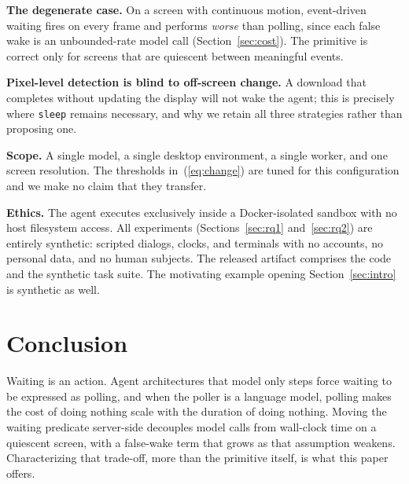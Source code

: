 \documentclass[conference]{IEEEtran}
\begin{document}
\textbf{The degenerate case.} On a screen with continuous motion, event-driven
waiting fires on every frame and performs \emph{worse} than polling, since each
false wake is an unbounded-rate model call (Section~\ref{sec:cost}). The primitive is
correct only for screens that are quiescent between meaningful events.

\textbf{Pixel-level detection is blind to off-screen change.} A download that
completes without updating the display will not wake the agent; this is precisely
where \texttt{sleep} remains necessary, and why we retain all three strategies
rather than proposing one.

\textbf{Scope.} A single model, a single desktop environment, a single worker,
and one screen resolution. The thresholds in~(\ref{eq:change}) are tuned for this
configuration and we make no claim that they transfer.

\textbf{Ethics.} The agent executes exclusively inside a Docker-isolated
sandbox with no host filesystem access. All experiments
(Sections~\ref{sec:rq1} and~\ref{sec:rq2}) are entirely synthetic: scripted dialogs,
clocks, and terminals with no accounts, no personal data, and no human subjects.
The released artifact comprises the code and the synthetic task suite. The
motivating example opening Section~\ref{sec:intro} is synthetic as well.

\section{Conclusion}

Waiting is an action. Agent architectures that model only steps force waiting to
be expressed as polling, and when the poller is a language model, polling makes
the cost of doing nothing scale with the duration of doing nothing. Moving the
waiting predicate server-side decouples model calls from wall-clock time on a
quiescent screen, with a false-wake term that grows as that assumption weakens.
Characterizing that trade-off, more than the primitive itself, is what this paper
offers.

\end{document}
